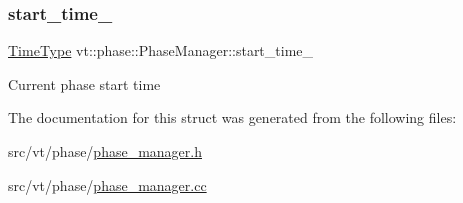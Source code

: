 \subsubsection{\texorpdfstring{start\+\_\+time\+\_\+}{start\_time\_}}
{\footnotesize\ttfamily \hyperlink{namespacevt_a876a9d0cd5a952859c72de8a46881442}{Time\+Type} vt\+::phase\+::\+Phase\+Manager\+::start\+\_\+time\+\_\+\hspace{0.3cm}{\ttfamily [private]}}

Current phase start time 

The documentation for this struct was generated from the following files\+:\begin{DoxyCompactItemize}
\item 
src/vt/phase/\hyperlink{phase__manager_8h}{phase\+\_\+manager.\+h}\item 
src/vt/phase/\hyperlink{phase__manager_8cc}{phase\+\_\+manager.\+cc}\end{DoxyCompactItemize}

